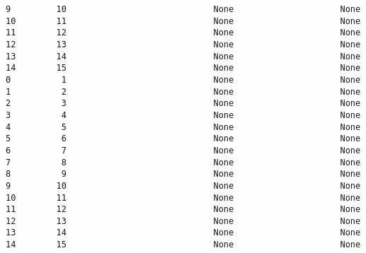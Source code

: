 \documentclass[11pt]{article}
\begin{document}
\begin{tcolorbox}[breakable, size=fbox, boxrule=.5pt, pad at break*=1mm, opacityfill=0]
\begin{Verbatim}[commandchars=\\\{\}]
9         10                             None                     None
10        11                             None                     None
11        12                             None                     None
12        13                             None                     None
13        14                             None                     None
14        15                             None                     None
0          1                             None                     None
1          2                             None                     None
2          3                             None                     None
3          4                             None                     None
4          5                             None                     None
5          6                             None                     None
6          7                             None                     None
7          8                             None                     None
8          9                             None                     None
9         10                             None                     None
10        11                             None                     None
11        12                             None                     None
12        13                             None                     None
13        14                             None                     None
14        15                             None                     None


\end{Verbatim}
\end{tcolorbox}
\end{document}
